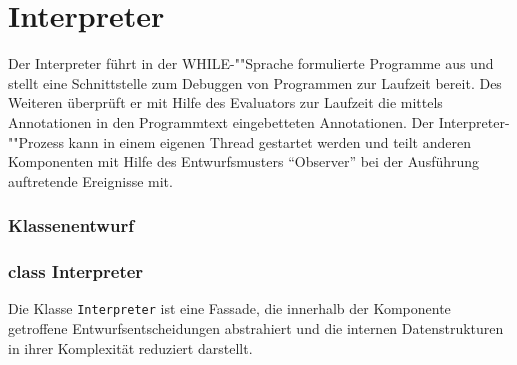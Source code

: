 \section{Interpreter}

Der Interpreter führt in der WHILE-""Sprache formulierte Programme aus und stellt eine Schnittstelle zum Debuggen von Programmen zur Laufzeit bereit. Des Weiteren überprüft er mit Hilfe des Evaluators zur Laufzeit die mittels Annotationen in den Programmtext eingebetteten Annotationen. Der Interpreter-""Prozess kann in einem eigenen Thread gestartet werden und teilt anderen Komponenten mit Hilfe des Entwurfsmusters ``Observer'' bei der Ausführung auftretende Ereignisse mit.

\subsubsection{Klassenentwurf}

\subsubsection{class Interpreter}
Die Klasse \texttt{Interpreter} ist eine Fassade, die innerhalb der Komponente getroffene Entwurfsentscheidungen abstrahiert und die internen Datenstrukturen in ihrer Komplexität reduziert darstellt.

